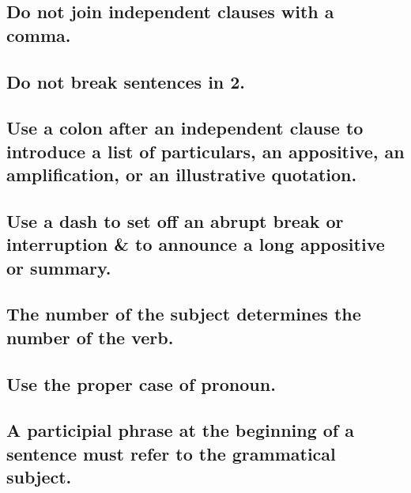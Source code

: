 \documentclass{article}
\numberwithin{equation}{section}
\begin{document}

\subsection{Do not join independent clauses with a comma.}


\subsection{Do not break sentences in 2.}


\subsection{Use a colon after an independent clause to introduce a list of particulars, an appositive, an amplification, or an illustrative quotation.}


\subsection{Use a dash to set off an abrupt break or interruption \& to announce a long appositive or summary.}


\subsection{The number of the subject determines the number of the verb.}


\subsection{Use the proper case of pronoun.}


\subsection{A participial phrase at the beginning of a sentence must refer to the grammatical subject.}
\end{document}
